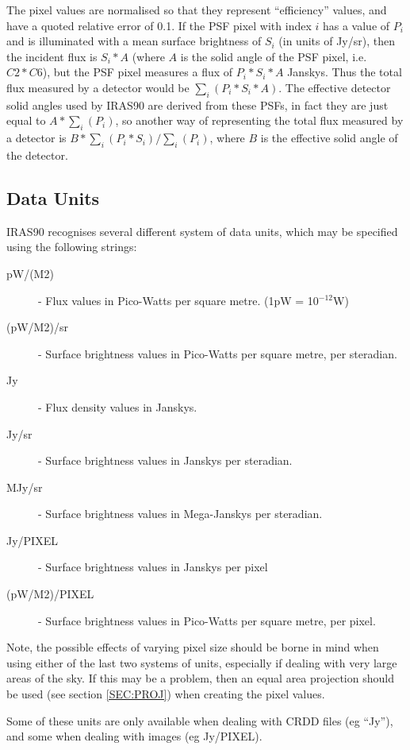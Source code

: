 \documentclass[11pt,nolof,noabs]{starlink}
\providecommand{\lsk}{\raisebox{-0.4ex}{\rm *}}
\begin{document}
The pixel values are normalised so that they represent ``efficiency''
values, and have a quoted relative error of 0.1. If the {\small PSF} pixel with
index $i$ has a value of $P_{i}$ and is illuminated with a mean surface
brightness of $S_{i}$ (in units of Jy/sr), then the incident flux is
$S_{i}*A$  (where $A$ is the solid angle of the {\small PSF} pixel,
i.e. $C2*C6$), but the {\small PSF} pixel measures a flux of
$P_{i}*S_{i}*A$ Janskys. Thus the total flux measured by a detector
would be $\sum_{i}( P_{i}*S_{i}*A)$. The effective detector solid
angles used by {\small IRAS90} are derived from these {\small PSF}s, in
fact they are just equal to $A*\sum_{i}(P_{i})$, so another way of
representing the total flux measured by a detector is $B*\sum_{i}(
P_{i}*S_{i} )/\sum_{i}( P_{i} )$, where $B$ is the effective solid
angle of the detector.

\subsection{Data Units}
\label{SEC:UNITS}
{\small IRAS90} recognises several different system of data units, which
may be specified using the following strings:

\begin{description}
\item [pW/(M\lsk\lsk2)] - Flux values in Pico-Watts per square metre.
                          (1pW = 10$^{-12}$W)
\item [(pW/M\lsk\lsk2)/sr] - Surface brightness values in Pico-Watts per
square metre, per steradian.
\item [Jy] - Flux density values in Janskys.
\item [Jy/sr] - Surface brightness values in Janskys per steradian.
\item [MJy/sr] - Surface brightness values in Mega-Janskys per steradian.
\item [Jy/PIXEL] - Surface brightness values in Janskys per pixel
\item [(pW/M\lsk\lsk2)/PIXEL] - Surface brightness values in Pico-Watts per
square metre, per pixel.
\end{description}
Note, the possible effects of varying pixel size should be borne
in mind when using either of the last two systems of units,
especially if dealing with very large areas of the sky. If this
may be a problem, then an equal area projection should be used
(see section \ref{SEC:PROJ}) when creating the pixel
values.

Some of these units are only available when dealing with {\small CRDD}
files (eg ``Jy''), and some when dealing with images (eg Jy/PIXEL).
\end{document}
